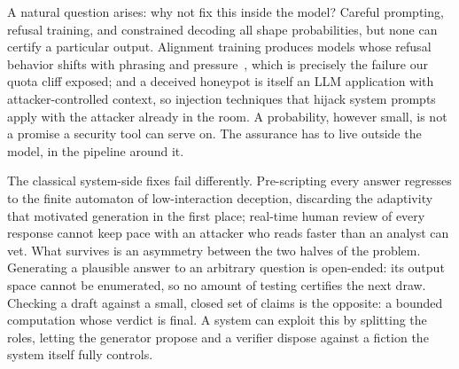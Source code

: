 A natural question arises: why not fix this inside the model? Careful
prompting, refusal training, and constrained decoding all shape
probabilities, but none can certify a particular output. Alignment
training produces models whose refusal behavior shifts with phrasing and
pressure~\cite{ganguli2022,bai2022}, which is precisely the failure our
quota cliff exposed; and a deceived honeypot is itself an LLM application
with attacker-controlled context, so injection techniques that hijack
system prompts~\cite{greshake2023} apply with the attacker already in the
room. A probability, however small, is not a promise a security tool
can serve on. The assurance has to live outside the model, in the
pipeline around it.

The classical system-side fixes fail differently. Pre-scripting every
answer regresses to the finite automaton of low-interaction deception,
discarding the adaptivity that motivated generation in the first place;
real-time human review of every response cannot keep pace with an
attacker who reads faster than an analyst can vet. What survives is an
asymmetry between the two halves of the problem. Generating a plausible
answer to an arbitrary question is open-ended: its output space cannot
be enumerated, so no amount of testing certifies the next draw.
Checking a draft against a small, closed set of claims is the opposite:
a bounded computation whose verdict is final. A system can exploit this
by splitting the roles, letting the generator propose and a verifier
dispose against a fiction the system itself fully controls.

